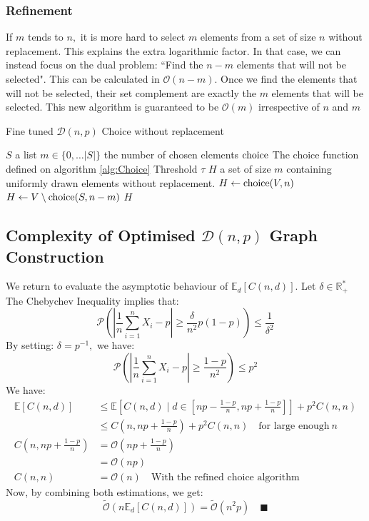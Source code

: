 \subsubsection{Refinement}
If $m$ tends to $n,$ it is more hard to select $m$ elements from a set of size $n$ without replacement. This explains the extra logarithmic factor.
\newline In that case, we can instead focus on the dual problem: ``Find the $n-m$ elements that will not be selected". This can be calculated in $\mathcal{O}(n-m).$
\newline Once we find the elements that will not be selected, their set complement are exactly the $m$ elements that will be selected. This new algorithm is guaranteed to be $\mathcal{O}(m)$ irrespective of $n$ and $m$
\begin{algorithm}
	\caption{Fine tuned $\mathcal{D}(n,p)$ Choice without replacement }\label{alg:ChoiceFineTuned}
	\begin{algorithmic}
		\Require $S$ a list
		\Require $m\in\{0,\dots \lvert S \rvert\}$ the number of chosen elements
		\Require $\operatorname{choice}$ The choice function defined on algorithm \ref{alg:Choice}
		\Require Threshold $\tau$
		\Ensure $H$ a set of size $m$ containing uniformly drawn elements without replacement. 
			\State $H\leftarrow \operatorname{choice}(V,n)$
		\Else
			\State $H\leftarrow V\setminus \operatorname{choice}(S,n-m)$
		\EndIf
		\State \Return $H$
	\end{algorithmic}
\end{algorithm}
\subsection{Complexity of Optimised $\mathcal{D}(n,p)$ Graph Construction}
We return to evaluate the asymptotic behaviour of $\mathbb{E}_d[C(n,d)].$
\newline Let $\delta \in \mathbb{R}_+^*$
\newline The Chebychev Inequality implies that:
$$
\mathscr{P}\left(\left \lvert \frac{1}{n}\sum_{i=1}^nX_i -p \right \rvert \ge \frac{\delta}{n^2}p(1-p)  \right) \le \frac{1}{\delta^2}
$$
By setting: $\delta=p^{-1},$ we have:
$$\mathscr{P}\left(\left \lvert \frac{1}{n}\sum_{i=1}^nX_i -p \right \rvert \ge \frac{1-p}{n^2}  \right) \le p^2
$$
We have:
\begin{align*}
\mathbb{E}\left[C(n,d)\right] &\le \mathbb{E}\left[C(n,d) \mid d\in [np-\tfrac{1-p}{n},np+\tfrac{1-p}{n}]\right] + p^2C(n,n) \\
&\le C(n,np+\tfrac{1-p}{n}) + p^2C(n,n) \quad \text{for large enough}\ n \\
C(n,np+\tfrac{1-p}{n})&=\mathcal{O}(np+\tfrac{1-p}{n})\\
&=\mathcal{O}(np)\\
C(n,n)&=\mathcal{O}(n) \quad \text{With the refined choice algorithm}
 \end{align*}
Now, by combining both estimations, we get:
$$
\tilde{\mathcal{O}}(n\mathbb{E}_d[C(n,d)])=\tilde{\mathcal{O}}(n^2p) \quad \blacksquare
$$

